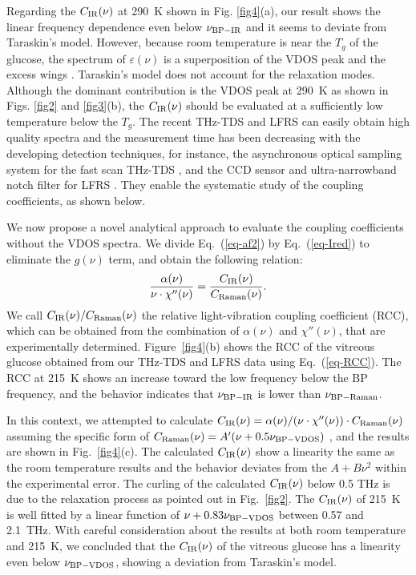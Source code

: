 \documentclass[%
 reprint,
superscriptaddress,
 amsmath,amssymb,
 aps,
prb,
]{revtex4-1}
\begin{document}
Regarding the $C_{\rm IR}(\nu)$ at 290~K shown in Fig. \ref{fig4}(a), our result shows the linear frequency dependence even below $\nu_{\rm BP-IR}$ and it seems to deviate from Taraskin's model.
However, because room temperature is near the $T_{g}$ of the glucose, the spectrum of $\varepsilon(\nu)$ is a superposition of the VDOS peak and the excess wings \cite{Kaminski2006}.
Taraskin's model does not account for the relaxation modes.
Although the dominant contribution is the VDOS peak at 290~K as shown in Figs. \ref{fig2} and \ref{fig3}(b), the $C_{\rm IR}(\nu)$ should be evaluated at a sufficiently low temperature below the $T_{g}$.
The recent THz-TDS and LFRS can easily obtain high quality spectra and the measurement time has been decreasing with the developing detection techniques, for instance, the asynchronous optical sampling system for the fast scan THz-TDS \cite{Mori2014IOP,Kojima2014IOP}, and the CCD sensor and ultra-narrowband notch filter for LFRS \cite{Fujii2016}.
They enable the systematic study of the coupling coefficients, as shown below.

We now propose a novel analytical approach to evaluate the coupling coefficients without the VDOS spectra. We divide Eq.~(\ref{eq-af2}) by Eq.~(\ref{eq-Ired}) to eliminate the $g(\nu)$ term, and obtain the following relation:
\begin{equation}
\frac{\alpha(\nu)}{\nu\cdot\chi''(\nu)} = \frac{C_{\rm IR}(\nu)}{C_{\rm Raman}(\nu)}.
\label{eq-RCC}
\end{equation}
We call $C_{\rm IR}(\nu)/C_{\rm Raman}(\nu)$ the relative light-vibration coupling coefficient (RCC), which can be obtained from the combination of $\alpha(\nu)$ and $\chi''(\nu)$, that are experimentally determined.
Figure~\ref{fig4}(b) shows the RCC of the vitreous glucose obtained from our THz-TDS and LFRS data using Eq.~(\ref{eq-RCC}).
The RCC at 215~K shows an increase toward the low frequency below the BP frequency, and the behavior indicates that $\nu_{\rm BP-IR}$ is lower than $\nu_{\rm BP-Raman}$.

In this context, we attempted to calculate $C_{\rm IR}(\nu) = \alpha(\nu)/(\nu\cdot\chi''(\nu))\cdot C_{\rm Raman}(\nu)$ assuming the specific form of $C_{\rm Raman}(\nu)=A'(\nu+0.5\nu_{\rm BP-VDOS})$ \cite{Surovtsev2002}, and the results are shown in Fig.~\ref{fig4}(c).
The calculated $C_{\rm IR}(\nu)$ show a linearity the same as the room temperature results and the behavior deviates from the $A + B\nu^{2}$ within the experimental error.
The curling of the calculated $C_{\rm IR}(\nu)$ below 0.5 THz is due to the relaxation process as pointed out in Fig.~\ref{fig2}.
The $C_{\rm IR}(\nu)$ of 215~K is well fitted by a linear function of $\nu + 0.83\nu_{\rm BP-VDOS}$ between 0.57 and 2.1~THz.
With careful consideration about the results at both room temperature and 215~K, we concluded that the $C_{\rm IR}(\nu)$ of the vitreous glucose has a linearity even below $\nu_{\rm BP-VDOS}$, showing a deviation from Taraskin's model.
\end{document}
